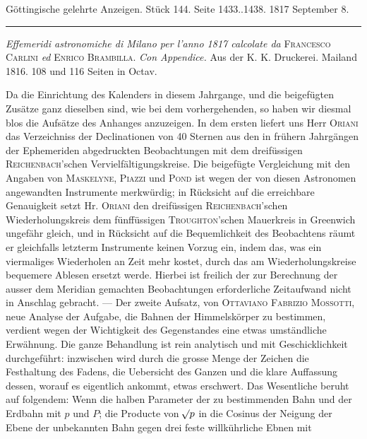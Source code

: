 \clearpage
{}
\hypertarget{native-606-lower}{}
\begin{center}\small Göttingische gelehrte Anzeigen. Stück 144. Seite 1433..1438. 1817 September 8.\\[3pt]\rule{.72\linewidth}{.3pt}\end{center}

{\setlength{\rightskip}{0pt plus 3em}\emph{Effemeridi astronomiche di Milano per l'anno \textup{1817} calcolate da} \textsc{Francesco Carlini} \emph{ed} \textsc{Enrico Brambilla}. \emph{Con Appendice.} Aus der K. K. Druckerei. Mailand 1816. 108 und 116 Seiten in Octav.\par}

Da die Einrichtung des Kalenders in diesem Jahrgange, und die beigefügten Zusätze ganz dieselben sind, wie bei dem vorhergehenden, so haben wir diesmal blos die Aufsätze des Anhanges anzuzeigen. In dem ersten liefert uns Herr \textsc{Oriani} das Verzeichniss der Declinationen von 40 Sternen aus den in frühern Jahrgängen der Ephemeriden abgedruckten Beobachtungen mit dem dreifüssigen \textsc{Reichenbach}'schen Vervielfältigungskreise. Die beigefügte Vergleichung mit den Angaben von \textsc{Maskelyne}, \textsc{Piazzi} und \textsc{Pond} ist wegen der von diesen Astronomen angewandten Instrumente merkwürdig; in Rücksicht auf die erreichbare Genauigkeit setzt Hr. \textsc{Oriani} den dreifüssigen \textsc{Reichenbach}'schen Wiederholungskreis dem fünffüssigen \textsc{Troughton}'schen Mauerkreis in Greenwich ungefähr gleich, und in Rücksicht auf die Bequemlichkeit des Beobachtens räumt er gleichfalls letzterm Instrumente keinen Vorzug ein, indem das, was ein viermaliges Wiederholen an Zeit mehr kostet, durch das am Wiederholungskreise bequemere Ablesen ersetzt werde. Hierbei ist freilich der zur Berechnung der ausser dem Meridian gemachten Beobachtungen erforderliche Zeitaufwand nicht in Anschlag gebracht. --- Der zweite Aufsatz, von \textsc{Ottaviano Fabrizio Mossotti}, neue Analyse der Aufgabe, die Bahnen der Himmelskörper zu bestimmen, verdient wegen der Wichtigkeit des Gegenstandes eine etwas umständliche Erwähnung. Die ganze Behandlung ist rein analytisch und mit Geschicklichkeit durchgeführt: inzwischen wird durch die grosse Menge der Zeichen die Festhaltung des Fadens, die Uebersicht des Ganzen und die klare Auffassung dessen, worauf es eigentlich ankommt, etwas erschwert. Das Wesentliche beruht auf folgendem: Wenn die halben Parameter der zu bestimmenden Bahn und der Erdbahn mit $p$ und $P$; die Producte von $\mathord{{}^{}\!\surd}p$ in die Cosinus der Neigung der Ebene der unbekannten Bahn gegen drei feste willkührliche Ebnen mit
